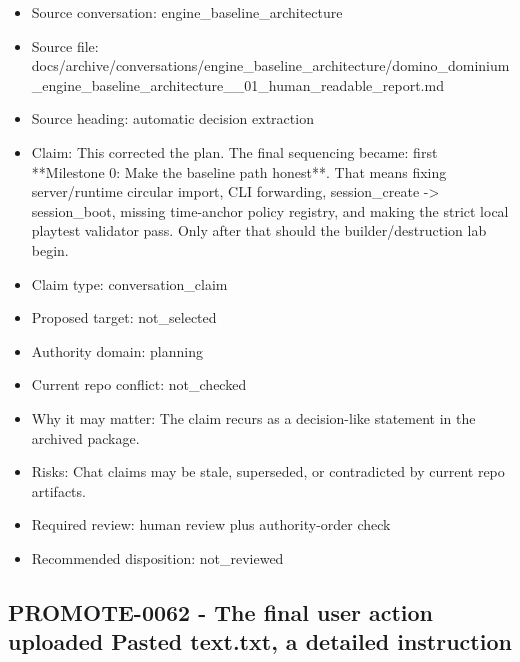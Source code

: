 \documentclass[11pt,a4paper]{report}
\begin{document}
\begin{itemize}
\item Source conversation: engine\_baseline\_architecture
\item Source file: docs/archive/conversations/engine\_baseline\_architecture/domino\_dominium\_engine\_baseline\_architecture\_\_01\_human\_readable\_report.md
\item Source heading: automatic decision extraction
\item Claim: This corrected the plan. The final sequencing became: first **Milestone 0: Make the baseline path honest**. That means fixing server/runtime circular import, CLI forwarding, session\_create -> session\_boot, missing time-anchor policy registry, and making the strict local playtest validator pass. Only after that should the builder/destruction lab begin.
\item Claim type: conversation\_claim
\item Proposed target: not\_selected
\item Authority domain: planning
\item Current repo conflict: not\_checked
\item Why it may matter: The claim recurs as a decision-like statement in the archived package.
\item Risks: Chat claims may be stale, superseded, or contradicted by current repo artifacts.
\item Required review: human review plus authority-order check
\item Recommended disposition: not\_reviewed
\end{itemize}

\subsection{PROMOTE-0062 - The final user action uploaded Pasted text.txt, a detailed instruction}
\end{document}
